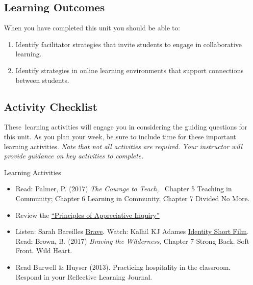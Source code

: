 \documentclass[
]{book}
\providecommand{\tightlist}{%
  \setlength{\itemsep}{0pt}\setlength{\parskip}{0pt}}
\begin{document}
\hypertarget{learning-outcomes-4}{%
\subsection*{Learning Outcomes}\label{learning-outcomes-4}}

When you have completed this unit you should be able to:

\begin{enumerate}
\def\labelenumi{\arabic{enumi}.}
\tightlist
\item
  Identify facilitator strategies that invite students to engage in collaborative learning.\\
\item
  Identify strategies in online learning environments that support connections between students.
\end{enumerate}

\hypertarget{activity-checklist-4}{%
\subsection*{Activity Checklist}\label{activity-checklist-4}}

These~learning activities will engage you in considering the guiding questions for this unit. As you plan your week, be sure to include time for these important learning activities. \emph{Note that not all activities are required. Your instructor will provide guidance on key activities to complete.}

\begin{reflect}
{Learning Activities}

\begin{itemize}
\tightlist
\item
  Read: Palmer, P. (2017) \emph{The Courage to Teach,} ~Chapter 5
  Teaching in Community; Chapter 6 Learning in Community, Chapter 7
  Divided No More.\\
\item
  Review the
  \href{https://appreciativeinquiry.champlain.edu/learn/appreciative-inquiry-introduction/5-classic-principles-ai}{``Principles
  of Appreciative Inquiry''}\\
\item
  Listen: Sarah Bareilles
  \href{https://www.youtube.com/watch?v=QUQsqBqxoR4}{Brave}. Watch:
  Kalhil KJ Adames
  \href{https://www.youtube.com/watch?v=ikGVWEvUzNM}{Identity Short
  Film}. Read: Brown, B. (2017) \emph{Braving the Wilderness,} Chapter 7
  Strong Back. Soft Front. Wild Heart.\\
\item
  Read Burwell \& Huyser (2013). Practicing hospitality in the
  classroom. Respond in your Reflective Learning Journal.
\end{itemize}
\end{reflect}
\end{document}
